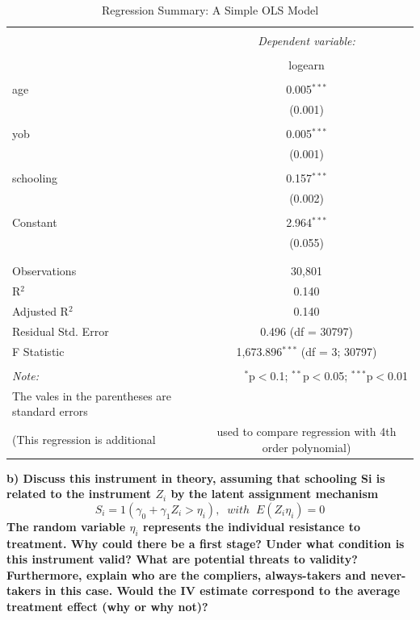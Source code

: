 \documentclass[a4paper,12pt,oneside,English]{article}
\begin{document}
\begin{table}[!htbp] \centering 
  \caption{Regression Summary: A Simple OLS Model} 
  \label{reg 2} 
\begin{tabular}{@{\extracolsep{5pt}}lc} 
\\[-1.8ex]\hline 
\hline \\[-1.8ex] 
 & \multicolumn{1}{c}{\textit{Dependent variable:}} \\ 
\cline{2-2} 
\\[-1.8ex] & logearn \\ 
\hline \\[-1.8ex] 
 age & 0.005$^{***}$ \\ 
  & (0.001) \\ 
  & \\ 
 yob & 0.005$^{***}$ \\ 
  & (0.001) \\ 
  & \\ 
 schooling & 0.157$^{***}$ \\ 
  & (0.002) \\ 
  & \\ 
 Constant & 2.964$^{***}$ \\ 
  & (0.055) \\ 
  & \\ 
\hline \\[-1.8ex] 
Observations & 30,801 \\ 
R$^{2}$ & 0.140 \\ 
Adjusted R$^{2}$ & 0.140 \\ 
Residual Std. Error & 0.496 (df = 30797) \\ 
F Statistic & 1,673.896$^{***}$ (df = 3; 30797) \\ 
\hline 
\hline \\[-1.8ex] 
\textit{Note:}  & \multicolumn{1}{r}{$^{*}$p$<$0.1; $^{**}$p$<$0.05; $^{***}$p$<$0.01} \\ The vales in the parentheses are standard errors\\(This regression is additional & used to compare regression with 4th order polynomial)
\end{tabular} 
\end{table} 
\textbf{b) Discuss this instrument in theory, assuming that schooling Si is related to the instrument $Z_i$ by the latent assignment mechanism
\begin{equation*}
    S_i = 1(\gamma_0+ \gamma_1 Z_i > \eta_i),\;\; with\;\; E(Z_i \eta _i) = 0
\end{equation*}
The random variable $\eta_i$ represents the individual resistance to treatment. Why could there be a
first stage? Under what condition is this instrument valid? What are potential threats to validity?
Furthermore, explain who are the compliers, always-takers and never-takers in this case. Would the IV estimate correspond to the average treatment effect (why or why not)?}\\
\end{document}
